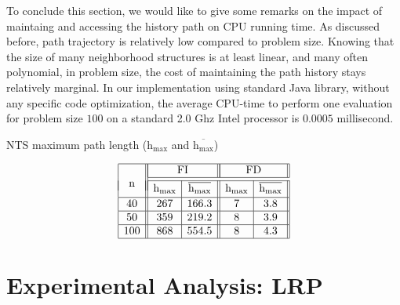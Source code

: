 \documentclass{acm_proc_article-sp}
\begin{document}
To conclude this section, we would like to give some remarks on the impact of maintaing and accessing the history path on CPU running time. As discussed before, path trajectory is relatively low compared to problem size. Knowing that the size of many neighborhood structures is at least linear, and many often polynomial, in problem size, the cost of maintaining the path history stays relatively marginal. In our implementation using standard Java library, without any specific code optimization, the average CPU-time to perform one evaluation for problem size $100$ on a standard 2.0 Ghz Intel processor is $0.0005$ millisecond.
\begin{table}[htb!]
\caption{NTS maximum path length ($\textrm{h}_{\max}$ and $\overline{\textrm{h}_{\max}}$)}\label{tab:height}
\vspace{-3ex}
$$
\begin{array}{|c||c|c||c|c||}
\hline
\multirow{3}{*}{\textrm{n}} & \multicolumn{2}{|c||}{\textrm{FI}} & \multicolumn{2}{|c||}{\textrm{FD}} \\ \cline{2-5}
 \\[-9 pt] 
\cline{2-5}
& \textrm{h}_{\max} & \overline{\textrm{h}_{\textrm{max}}} \rule[-5pt]{0pt}{15pt}  &  \textrm{h}_{\max} & \overline{\textrm{h}_{\max}}  \\ \hline

40 & 267 & 166.3 &  7 & 3.8  \\ \hline
50 & 359 & 219.2  & 8 & 3.9   \\ \hline
100 & 868 & 554.5  & 8 & 4.3 \\ \hline
\end{array}
$$
\end{table}

\section{Experimental Analysis: LRP}\label{sec:lrp}
\end{document}
